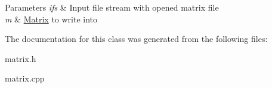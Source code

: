 \begin{DoxyParams}{Parameters}
{\em ifs} & Input file stream with opened matrix file \\
\hline
{\em m} & \hyperlink{class_matrix}{Matrix} to write into \\
\hline
\end{DoxyParams}


The documentation for this class was generated from the following files\+:\begin{DoxyCompactItemize}
\item 
matrix.\+h\item 
matrix.\+cpp\end{DoxyCompactItemize}

